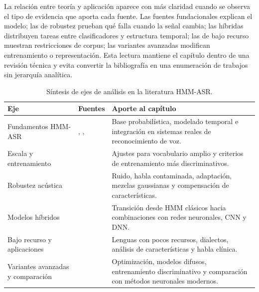 La relación entre teoría y aplicación aparece con más claridad cuando se observa el tipo de evidencia que aporta cada fuente. Las fuentes fundacionales explican el modelo; las de robustez prueban qué falla cuando la señal cambia; las híbridas distribuyen tareas entre clasificadores y estructura temporal; las de bajo recurso muestran restricciones de corpus; las variantes avanzadas modifican entrenamiento o representación. Esta lectura mantiene el capítulo dentro de una revisión técnica y evita convertir la bibliografía en una enumeración de trabajos sin jerarquía analítica.
\begin{table}[H]
\centering
\footnotesize
\setlength{\tabcolsep}{4pt}
\renewcommand{\arraystretch}{0.92}
\caption{Síntesis de ejes de análisis en la literatura HMM-ASR.}
\label{tab:hmm_sintesis}
\begin{tabular}{L{0.21\textwidth}L{0.25\textwidth}L{0.36\textwidth}}
\toprule
\textbf{Eje} & \textbf{Fuentes} & \textbf{Aporte al capítulo} \\
\midrule
Fundamentos HMM-ASR & \cite{Rabiner1989TutoriHidden,Juang1991HiddenMarkov}, \cite{Lee1990SpeechRecogn}, \cite{MeiYuhHwang1993SharedDistri} & Base probabilística, modelado temporal e integración en sistemas reales de reconocimiento de voz. \\
Escala y entrenamiento & \cite{ilingas2004SpecifHidden,Sha2007LargeMargin} & Ajustes para vocabulario amplio y criterios de entrenamiento más discriminativos. \\
Robustez acústica & \cite{Vaseghi1997NoiseCompen,Matassoni2002HiddenMarkov,QiangHuo2006UnsupeOnline,Zhao2012StrandGaussi,Mushtaq2012IntegrApproa} & Ruido, habla contaminada, adaptación, mezclas gaussianas y compensación de características. \\
Modelos híbridos & \cite{Cohen1992HybridNeural,Kundu1998SpeechRecogn,Tang2009HybridHidden,Justin2013HybridSpeech,Chen2020ResearImprov,Shanthamallappa2026DeepNeural} & Transición desde HMM clásicos hacia combinaciones con redes neuronales, CNN y DNN. \\
Bajo recurso y aplicaciones & \cite{DeWet2017SpeechRecogn,Alume2004LimiteVocabu,Mouaz2019SpeechRecogn,Yulita2018FeaturExtrac,Lee2019AssessDysart} & Lenguas con pocos recursos, dialectos, análisis de características y habla clínica. \\
Variantes avanzadas y comparación & \cite{Mustafa2019ComparReview,Sha2007LargeMargin,Selvaraj2014EnhancSpeech,Zhang2025FuzzySpeech} & Optimización, modelos difusos, entrenamiento discriminativo y comparación con métodos neuronales modernos. \\
\bottomrule
\end{tabular}
\end{table}

